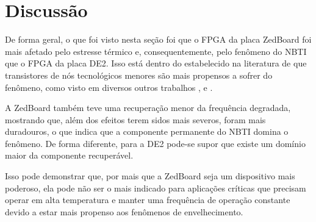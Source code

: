 \section{Discussão}
\label{ResDiscussao}

De forma geral, o que foi visto nesta seção foi que o FPGA da placa ZedBoard foi mais afetado pelo estresse térmico e, consequentemente, pelo fenômeno do NBTI que o FPGA da placa DE2. Isso está dentro do estabelecido na literatura de que transistores de nós tecnológicos menores são mais propensos a sofrer do fenômeno, como visto em diversos outros trabalhos \cite{Chen}, \cite{Paul} e \cite{Zeng}.

A ZedBoard também teve uma recuperação menor da frequência degradada, mostrando que, além dos efeitos terem sidos mais severos, foram mais duradouros, o que indica que a componente permanente do NBTI \cite{Banaszeski} domina o fenômeno. De forma diferente, para a DE2 pode-se supor que existe um domínio maior da componente recuperável.

Isso pode demonstrar que, por mais que a ZedBoard seja um dispositivo mais poderoso, ela pode não ser o mais indicado para aplicações críticas que precisam operar em alta temperatura e manter uma frequência de operação constante devido a estar mais propenso aos fenômenos de envelhecimento.